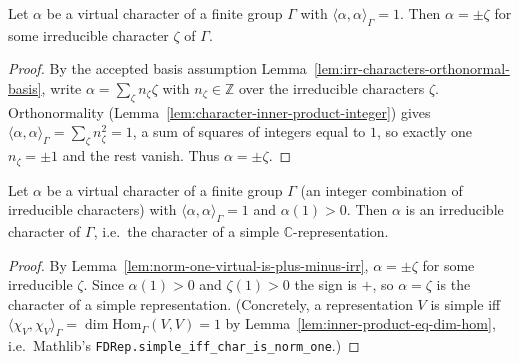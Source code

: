\begin{lemma}
    \label{lem:norm-one-virtual-is-plus-minus-irr}
    Let $\alpha$ be a virtual character of a finite group $\Gamma$ with
    $\langle\alpha,\alpha\rangle_\Gamma = 1$. Then $\alpha = \pm\zeta$ for some
    irreducible character $\zeta$ of $\Gamma$.
\end{lemma}
\begin{proof}
    By the accepted basis assumption
    Lemma~\ref{lem:irr-characters-orthonormal-basis}, write $\alpha = \sum_\zeta
    n_\zeta \zeta$ with $n_\zeta \in \mathbb{Z}$ over the irreducible characters
    $\zeta$. Orthonormality (Lemma~\ref{lem:character-inner-product-integer}) gives
    $\langle\alpha,\alpha\rangle_\Gamma = \sum_\zeta n_\zeta^2 = 1$, a sum of
    squares of integers equal to $1$, so exactly one $n_\zeta = \pm 1$ and the
    rest vanish. Thus $\alpha = \pm\zeta$.
\end{proof}

\begin{lemma}
    \label{lem:norm-one-virtual-is-irreducible}
    \leanok
    Let $\alpha$ be a virtual character of a finite group $\Gamma$ (an integer
    combination of irreducible characters) with $\langle\alpha,\alpha\rangle_\Gamma
    = 1$ and $\alpha(1) > 0$. Then $\alpha$ is an irreducible character of
    $\Gamma$, i.e.\ the character of a simple $\mathbb{C}$-representation.
\end{lemma}
\begin{proof}
    By Lemma~\ref{lem:norm-one-virtual-is-plus-minus-irr}, $\alpha = \pm\zeta$ for
    some irreducible $\zeta$. Since $\alpha(1) > 0$ and $\zeta(1) > 0$ the sign is
    $+$, so $\alpha = \zeta$ is the character of a simple representation.
    (Concretely, a representation $V$ is simple iff
    $\langle\chi_V,\chi_V\rangle_\Gamma = \dim\mathrm{Hom}_\Gamma(V,V) = 1$ by
    Lemma~\ref{lem:inner-product-eq-dim-hom}, i.e.\ Mathlib's
    \texttt{FDRep.simple\_iff\_char\_is\_norm\_one}.)
\end{proof}

